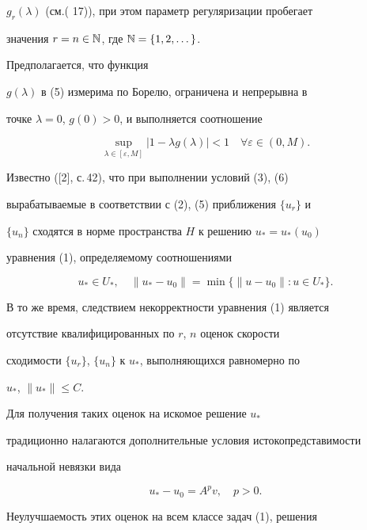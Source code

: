 $g_r(\lambda)$ (см.( 17)), при этом параметр регуляризации пробегает 


значения $r=n\in\Bbb N$, где $\Bbb N=\{1,2,\dotsc\}$. 


Предполагается, что функция 


$g(\lambda)$ в (5) измерима по Борелю, ограничена и непрерывна в 


точке $\lambda=0$, $g(0)>0$, и выполняется соотношение 


\begin{equation} 


\sup_{\lambda\in[\varepsilon,M]}|1-\lambda g(\lambda)| 


<1\quad \forall\varepsilon\in(0,M). 


\end{equation} 


Известно ([2], с.\,42), что при выполнении условий (3), (6) 


вырабатываемые в соответствии с (2), (5) приближения $\{u_r\}$ и 


$\{u_n\}$ сходятся в норме пространства $H$ к решению $u_*=u_*(u_0)$ 


уравнения (1), определяемому соотношениями 


\begin{equation} 


u_*\in U_*,\quad 


\|u_*-u_0\|=\min\{\|u-u_0\|:u\in U_*\}. 


\end{equation} 


В то же время, следствием некорректности уравнения (1) является 


отсутствие квалифицированных по $r$, $n$ оценок скорости 


сходимости $\{u_r\}$, $\{u_n\}$ к $u_*$, выполняющихся равномерно по 


$u_*$, $\|u_*\|\le C$. 


Для получения таких оценок на искомое решение $u_*$ 


традиционно налагаются дополнительные условия истокопредставимости 


начальной невязки вида 


\begin{equation} 


u_*-u_0=A^p v,\quad p>0. 


\end{equation} 


Неулучшаемость этих оценок на всем классе задач (1), решения 


